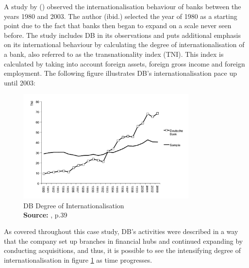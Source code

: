 \documentclass[11pt,a4paper]{article}
\newcommand*{\captionsource}[2]{%
  \caption[{#1}]{%
    #1%
    \\\hspace{\linewidth}%
    \textbf{Source:} #2%
  }%
}
\begin{document}
{{A study by \citeauthor{slagerInternationalizationBanksStrategic2005} (\citeyear{slagerInternationalizationBanksStrategic2005}) observed the internationalisation behaviour of banks between the years 1980 and 2003. The author (ibid.) selected the year of 1980 as a starting point due to the fact that banks then began to expand on a scale never seen before. The study includes DB in its observations and puts additional emphasis on its international behaviour by calculating the degree of internationalisation of a bank, also referred to as the transnationality index (TNI). This index is calculated by taking into account foreign assets, foreign gross income and foreign employment. The following figure illustrates DB's internationalisation pace up until 2003:

  \vspace{5mm}
\begin{figure}[H]
	\centering
  \includegraphics[width=90mm]{figures/fig_db_internationalisation}
  \vspace{5mm}
    \captionsetup{justification=centering,margin=2cm}
      \captionsource{DB Degree of Internationalisation}{\cite{slagerInternationalizationBanksStrategic2005}, p.39}
	\label{fig:db_international}
\end{figure}

As covered throughout this case study, DB's activities were described in a way that the company set up branches in financial hubs and continued expanding by conducting acquisitions, and thus, it is possible to see the intensifying degree of internationalisation in figure \ref{fig:db_international} as time progresses.

\vspace{-2mm}
}}
\end{document}
